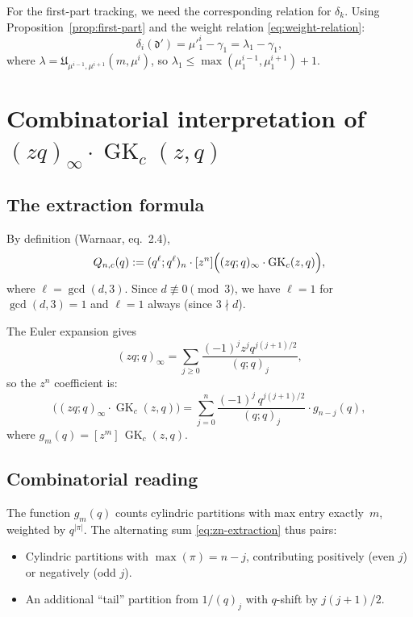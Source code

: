 \documentclass[11pt]{article}
\newcommand{\GK}{\operatorname{GK}}
\newcommand{\qpoch}[2]{(#1;#2)_\infty}
\newcommand{\qpochn}[3]{(#1;#2)_{#3}}
\begin{document}
For the first-part tracking, we need the corresponding relation for $\delta_k$.
Using Proposition~\ref{prop:first-part} and the weight relation
\eqref{eq:weight-relation}:
\begin{equation}
  \delta_i(\mathfrak{d}') = \mu'^i_1 - \gamma_1
  = \lambda_1 - \gamma_1,
\end{equation}
where $\lambda = \mathfrak{U}_{\mu^{i-1}, \mu^{i+1}}(m, \mu^i)$, so
$\lambda_1 \leq \max(\mu^{i-1}_1, \mu^{i+1}_1) + 1$.


\section{Combinatorial interpretation of $(zq)_\infty \cdot \GK_c(z,q)$}
\label{sec:combinatorial-interp}

\subsection{The extraction formula}

By definition (Warnaar, eq.~2.4),
\begin{equation}
  Q_{n,c}(q) := \qpochn{q^\ell}{q^\ell}{n} \cdot [z^n]
  \Bigl(\qpoch{zq}{q} \cdot \GK_c(z,q)\Bigr),
  \label{eq:Q-def}
\end{equation}
where $\ell = \gcd(d, 3)$. Since $d \not\equiv 0 \pmod{3}$, we have $\ell = 1$
for $\gcd(d,3) = 1$ and $\ell = 1$ always (since $3 \nmid d$).

The Euler expansion gives
\[
  \qpoch{zq}{q} = \sum_{j \geq 0} \frac{(-1)^j z^j q^{j(j+1)/2}}{\qpochn{q}{q}{j}},
\]
so the $z^n$ coefficient is:
\begin{equation}
  [z^n]\bigl(\qpoch{zq}{q} \cdot \GK_c(z,q)\bigr)
  = \sum_{j=0}^{n} \frac{(-1)^j\, q^{j(j+1)/2}}{\qpochn{q}{q}{j}} \cdot g_{n-j}(q),
  \label{eq:zn-extraction}
\end{equation}
where $g_m(q) = [z^m]\,\GK_c(z,q)$.

\subsection{Combinatorial reading}

The function $g_m(q)$ counts cylindric partitions with max entry exactly~$m$,
weighted by $q^{|\pi|}$. The alternating sum \eqref{eq:zn-extraction} thus pairs:
\begin{itemize}
  \item Cylindric partitions with $\max(\pi) = n - j$, contributing positively (even $j$)
    or negatively (odd $j$).
  \item An additional ``tail'' partition from $1/(q)_j$ with $q$-shift by $j(j+1)/2$.
\end{itemize}
\end{document}
